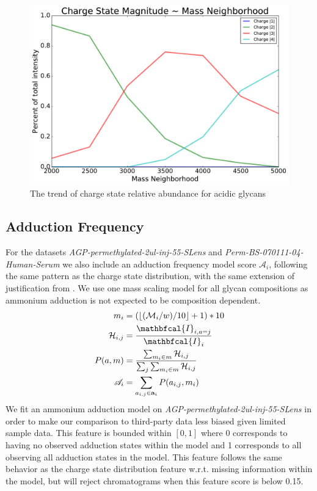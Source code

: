         \begin{figure}
            \centering
            \includegraphics[width=0.75\linewidth]{figure/charge_trend_plot}
            \caption{The trend of charge state relative abundance for acidic glycans}
            \label{fig:charge_trend_plot}
        \end{figure}

    \subsection{Adduction Frequency}
        For the datasets \textit{AGP-permethylated-2ul-inj-55-SLens} and \textit{Perm-BS-070111-04-Human-Serum}
        we also include an adduction frequency model score $\mathscr{A}_i$, following the same
        pattern as the charge state distribution, with the same extension of justification
        from \cite{Maxwell2012}. We use one mass scaling model for all glycan compositions
        as ammonium adduction is not expected to be composition dependent.
        \begin{align}
            m_i &= (\floor*{(\mathcal{M}_i / w) / 10} + 1) * 10 \nonumber\\
            \mathcal{H}_{i,j} &= \frac{
                \mathbfcal{I}_{i, a=j}}{\mathbfcal{I}_i} \nonumber\\
            P(a, m) &= \frac{\sum_{m_i \in m} \mathcal{H}_{i, j}}{\sum_j{
                \sum_{m_i \in m} \mathcal{H}_{i, j}}} \nonumber\\
            \mathscr{A}_i &= \sum_{a_{i, j} \in \mathbf{a}_i}{P(a_{i, j}, m_i)}
        \end{align}
        We fit an ammonium adduction model on \textit{AGP-permethylated-2ul-inj-55-SLens}
        in order to make our comparison to third-party data less biased given limited sample data.
        This feature is bounded within $[0, 1]$ where 0 corresponds to having no observed adduction
        states within the model and 1 corresponds to all observing all adduction states in the model.
        This feature follows the same behavior as the charge state distribution feature w.r.t. missing
        information within the model, but will reject chromatograms when this feature score is below 0.15.

